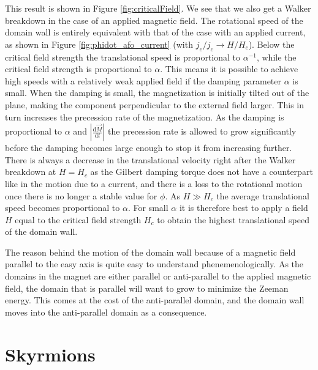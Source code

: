 \documentclass[1p]{elsarticle}		%
\numberwithin{equation}{section}
\begin{document}
This result is shown in Figure \ref{fig:criticalField}. We see that we also get a Walker breakdown in the case of an applied magnetic field. The rotational speed of the domain wall is entirely equivalent with that of the case with an applied current, as shown in Figure \ref{fig:phidot_afo_current} (with $j_e/j_c \rightarrow H/H_c$). Below the critical field strength the translational speed is proportional to $\alpha^{-1}$, while the critical field strength is proportional to $\alpha$. This means it is possible to achieve high speeds with a relatively weak applied field if the damping parameter $\alpha$ is small. When the damping is small, the magnetization is initially tilted out of the plane, making the component perpendicular to the external field larger. This in turn increases the precession rate of the magnetization. As the damping is proportional to $\alpha$ and $|\frac{\textrm{d} \vec{M}}{\textrm{d} t}|$ the precession rate is allowed to grow significantly before the damping becomes large enough to stop it from increasing further. There is always a decrease in the translational velocity right after the Walker breakdown at $H=H_c$ as the Gilbert damping torque does not have a counterpart like in the motion due to a current, and there is a loss to the rotational motion once there is no longer a stable value for $\phi$. As $H\gg H_c$ the average translational speed becomes proportional to $\alpha$. For small $\alpha$ it is therefore best to apply a field $H$ equal to the critical field strength $H_c$ to obtain the highest translational speed of the domain wall.

The reason behind the motion of the domain wall because of a magnetic field parallel to the easy axis is quite easy to understand phenemenologically. As the domains in the magnet are either parallel or anti-parallel to the applied magnetic field, the domain that is parallel will want to grow to minimize the Zeeman energy. This comes at the cost of the anti-parallel domain, and the domain wall moves into the anti-parallel domain as a consequence.

\section{Skyrmions}
\end{document}
